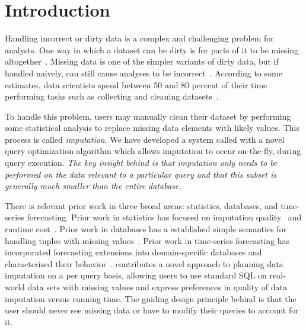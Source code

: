 \section{Introduction}

Handling incorrect or dirty data is a complex and challenging problem for analysts.
One way in which a dataset can be dirty is for parts of it to be missing altogether~\cite{kim2003}.
Missing data is one of the simpler variants of dirty data, but if handled naively, can still cause analyses to be incorrect~\cite{rubin1976}.
According to some estimates, data scientists spend between 50 and 80 percent of their time performing tasks such as collecting and cleaning datasets~\cite{data-science-cleaning}.

To handle this problem, users may manually clean their dataset by performing some statistical analysis to replace missing data elements with likely values.
This process is called \emph{imputation}.
We have developed a system called \ProjectName{} with a novel query optimization algorithm which allows imputation to occur on-the-fly, during query execution. \emph{The key insight behind \ProjectName{} is that imputation
only needs to be performed on the data relevant to a particular query and
that this subset is generally much smaller than the entire database.} 

There is relevant prior work in three broad areas: statistics, databases, and time-series forecasting.
Prior work in statistics has focused on imputation quality~\cite{burgette2010multiple} and runtime cost~\cite{akande2015empirical}.
Prior work in databases has a established simple semantics for handling tuples with missing values~\cite{codd1973understanding,grant1977null}.
Prior work in time-series forecasting has incorporated forecasting extensions into domain-specific databases and characterized their behavior~\cite{parisi2011embedding,parisi2013temporal,duan2007processing}.
\ProjectName{} contributes a novel approach to planning data imputation on a per query basis, allowing users to use standard SQL on real-world data sets with missing values
and express preferences in quality of data imputation versus running time. The guiding design principle behind \ProjectName{} is that the user should never see missing data or have to modify their queries to account for it.

